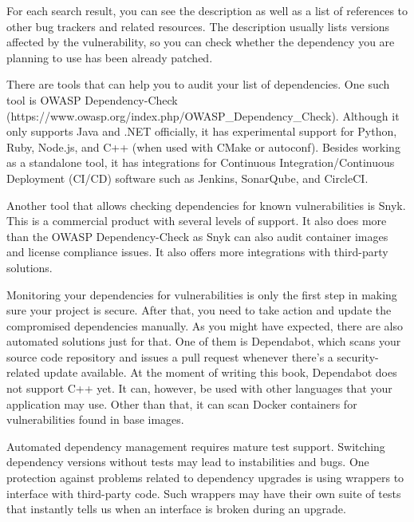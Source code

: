 For each search result, you can see the description as well as a list of references to other bug trackers and related resources. The description usually lists versions affected by the vulnerability, so you can check whether the dependency you are planning to use has been already patched.


There are tools that can help you to audit your list of dependencies. One such tool is OWASP Dependency-Check (https://www.owasp.org/index.php/OWASP\_Dependency\_Check). Although it only supports Java and .NET officially, it has experimental support for Python, Ruby, Node.js, and C++ (when used with CMake or autoconf). Besides working as a standalone tool, it has integrations for Continuous Integration/Continuous Deployment (CI/CD) software such as Jenkins, SonarQube, and CircleCI.

Another tool that allows checking dependencies for known vulnerabilities is Snyk. This is a commercial product with several levels of support. It also does more than the OWASP Dependency-Check as Snyk can also audit container images and license compliance issues. It also offers more integrations with third-party solutions.


Monitoring your dependencies for vulnerabilities is only the first step in making sure your project is secure. After that, you need to take action and update the compromised dependencies manually. As you might have expected, there are also automated solutions just for that. One of them is Dependabot, which scans your source code repository and issues a pull request whenever there's a security-related update available. At the moment of writing this book, Dependabot does not support C++ yet. It can, however, be used with other languages that your application may use. Other than that, it can scan Docker containers for vulnerabilities found in base images.

Automated dependency management requires mature test support. Switching dependency versions without tests may lead to instabilities and bugs. One protection against problems related to dependency upgrades is using wrappers to interface with third-party code. Such wrappers may have their own suite of tests that instantly  tells us when an interface is broken during an upgrade.










